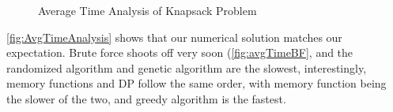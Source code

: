 \documentclass[a4paper, 11pt]{article}
\begin{document}
\begin{figure}[!ht] 
  \caption{Average Time Analysis of Knapsack Problem} 
  \centering
  \label{fig:AvgTimeAnalysis}
\end{figure}

\autoref{fig:AvgTimeAnalysis} shows that our numerical solution matches our expectation. Brute force shoots off very soon (\autoref{fig:avgTimeBF}, and the randomized algorithm and genetic algorithm are the slowest, interestingly, memory functions and DP follow the same order, with memory function being the slower of the two, and greedy algorithm is the fastest. 
\end{document}
